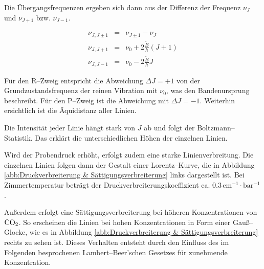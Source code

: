 \documentclass[12pt,a4paper]{scrartcl}
\numberwithin{equation}{section} %
\begin{document}
\noindent
Die Übergangsfrequenzen ergeben sich dann aus der Differenz der Frequenz $\nu_J$ und $\nu_{J+1}$ bzw. $\nu_{J-1}$.

\begin{eqnarray}
	\nu_{J, J\pm1} &=& \nu_{J\pm1} - \nu_J \\
	\nu_{J, J+1} &=& \nu_0 + 2 \frac{\tilde{B}}{h} (J+1) \\
	\nu_{J, J-1} &=& \nu_0 - 2 \frac{\tilde{B}}{h} J
\end{eqnarray}

\noindent
Für den R--Zweig entspricht die Abweichung $\Delta J = +1$ von der Grundzustandsfrequenz der reinen Vibration mit $\nu_0$, was den Bandenursprung beschreibt. Für den P--Zweig ist die Abweichung mit $\Delta J = -1$. Weiterhin ersichtlich ist die Äquidistanz aller Linien.

Die Intensität jeder Linie hängt stark von $J$ ab und folgt der Boltzmann--Statistik. Das erklärt die unterschiedlichen Höhen der einzelnen Linien.

Wird der Probendruck erhöht, erfolgt zudem eine starke Linienverbreitung. Die einzelnen Linien folgen dann der Gestalt einer Lorentz--Kurve, die in Abbildung \ref{abb:Druckverbreiterung & Sättigungsverbreiterung} links dargestellt ist. Bei Zimmertemperatur beträgt der Druckverbreiterungskoeffizient ca. $0.3 \mathrm{\, cm^{-1}\cdot bar^{-1}}$ \cite{UzK}.

Außerdem erfolgt eine Sättigungsverbreiterung bei höheren Konzentrationen von $\ce{CO_2}$. So erscheinen die Linien bei hohen Konzentrationen in Form einer Gauß--Glocke, wie es in Abbildung \ref{abb:Druckverbreiterung & Sättigungsverbreiterung} rechts zu sehen ist. Dieses Verhalten entsteht durch den Einfluss des im Folgenden besprochenen Lambert--Beer'schen Gesetzes für zunehmende Konzentration.
\end{document}
